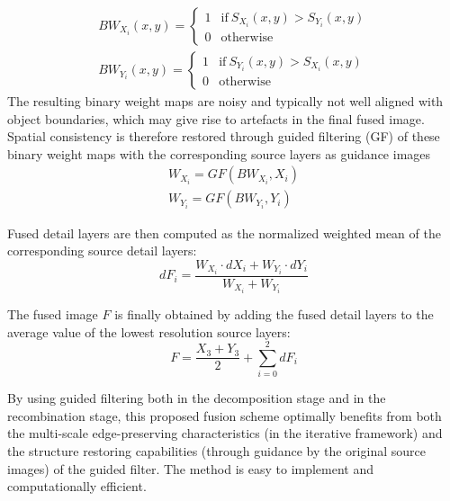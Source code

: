 \begin{gather*}
BW_{X_i}(x, y) =    
\begin{cases}
1 & \mathrm{if} \: S_{X_i}(x, y) > S_{Y_i}(x, y) \\
0 & \mathrm{otherwise}
\end{cases}\\
BW_{Y_i}(x,y) = 
\begin{cases}
1 & \mathrm{if} \: S_{Y_i}(x, y) > S_{X_i}(x, y)\\
0 & \mathrm{otherwise}
\end{cases}
\end{gather*}
The resulting binary weight maps are noisy and typically not well aligned with object boundaries, which may give rise to artefacts in the final fused image. Spatial consistency is therefore restored through guided filtering (GF) of these binary
weight maps with the corresponding source layers as guidance images
\begin{gather*}
W_{X_i} = GF(BW_{X_i}, X_i) \\
W_{Y_i} = GF(BW_{Y_i}, Y_i)
\end{gather*}

Fused detail layers are then computed as the normalized weighted mean of the corresponding source detail layers:
\begin{displaymath}
dF_i = \frac{W_{X_i} \cdot dX_i + W_{Y_i} \cdot dY_i}{W_{X_i} + W_{Y_i}}
\end{displaymath}

The fused image $F$ is finally obtained by adding the fused detail layers to the average value of the lowest resolution source layers:
\begin{displaymath}
F = \frac{X_3 + Y_3}{2} + \sum_{i=0}^{2}dF_i
\end{displaymath}

By using guided filtering both in the decomposition stage and in the recombination stage, this proposed fusion scheme optimally benefits from both the multi-scale edge-preserving characteristics (in the iterative framework) and the structure
restoring capabilities (through guidance by the original source images) of the guided filter. The method is easy to implement and computationally efficient.

